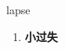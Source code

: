 
\begin{frame}
{\huge lapse}
\begin{center}
\begin{enumerate}\Large
  \item \textbf{小过失}
\end{enumerate}
\end{center}
\end{frame}
